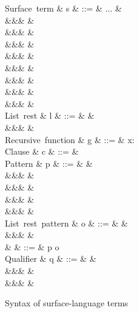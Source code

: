 \begin{figure}[H]
\begin{syntaxfig}
\mbox{Surface term}
&
s
&
::=
&
...
&
\\
&&&
&
\\
&&&
&
\\
&&&
&
\\
&&&
&
\\
&&&
&
\\
&&&
&
\\
&&&
&
\\
&&&
&
\\[2mm]

\mbox{List rest}
&
l
&
::=
&
\annListEnd{\alpha}
&
\\
&&&
&
\\[2mm]

\mbox{Recursive function}
&
g
&
::=
&
x: 
\\[2mm]

\mbox{Clause}
&
c
&
::=
&
\\[2mm]

\mbox{Pattern}
&
p
&
::=
&
&
\\
&&&
\pattNil
&
\\
&&&
&
\\
&&&
&
\\
&&&
&
\\[2mm]

\mbox{List rest pattern}
&
o
&
::=
&
\pattListEnd
&
\\
&&&
&
\\[2mm]

&
\pi
&
::=
&
p \mid o
\\[2mm]

\mbox{Qualifier}
&
q
&
::=
&
&
\\
&&&
&
\\
&&&
&
\\[2mm]

\end{syntaxfig}
\caption{Syntax of surface-language terms}
\end{figure}
